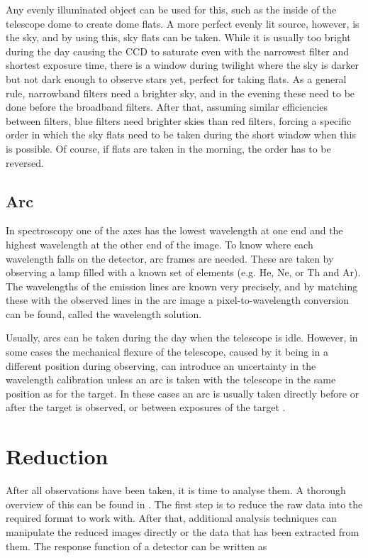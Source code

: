 \documentclass[a4paper,oneside,12pt, class=Latex/Classes/PhDthesisPSnPDF, crop=false]{standalone}
\begin{document}
Any evenly illuminated object can be used for this, such as the inside of the telescope dome to create dome flats. A more perfect evenly lit source, however, is the sky, and by using this, sky flats can be taken. While it is usually too bright during the day causing the CCD to saturate even with the narrowest filter and shortest exposure time, there is a window during twilight where the sky is darker but not dark enough to observe stars yet, perfect for taking flats. As a general rule, narrowband filters need a brighter sky, and in the evening these need to be done before the broadband filters. After that, assuming similar efficiencies between filters, blue filters need brighter skies than red filters, forcing a specific order in which the sky flats need to be taken during the short window when this is possible. Of course, if flats are taken in the morning, the order has to be reversed.


\subsection{Arc}
In spectroscopy one of the axes has the lowest wavelength at one end and the highest wavelength at the other end of the image. To know where each wavelength falls on the detector, arc frames are needed. These are taken by observing a lamp filled with a known set of elements (e.g. He, Ne, or Th and Ar). The wavelengths of the emission lines are known very precisely, and by matching these with the observed lines in the arc image a pixel-to-wavelength conversion can be found, called the wavelength solution.

Usually, arcs can be taken during the day when the telescope is idle. However, in some cases the mechanical flexure of the telescope, caused by it being in a different position during observing, can introduce an uncertainty in the wavelength calibration unless an arc is taken with the telescope in the same position as for the target. In these cases an arc is usually taken directly before or after the target is observed, or between exposures of the target \citep{CCD_handbook}.


\section{Reduction}
\label{reduction}
After all observations have been taken, it is time to analyse them. A thorough overview of this can be found in \citet{Image_processing}. The first step is to reduce the raw data into the required format to work with. After that, additional analysis techniques can manipulate the reduced images directly or the data that has been extracted from them. The response function of a detector can be written as
\end{document}
